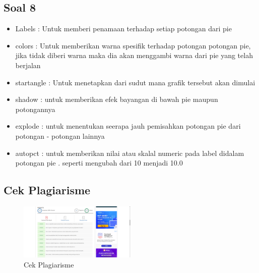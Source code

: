 	\subsection{Soal 8}
	\begin{itemize}
		\item Labels : Untuk memberi penamaan terhadap setiap potongan dari pie
		\item colors : Untuk memberikan warna spesifik terhadap potongan potongan pie, jika tidak diberi warna maka dia akan menggambi warna dari pie yang telah berjalan
		\item startangle : Untuk menetapkan dari sudut mana grafik tersebut akan dimulai
		\item shadow : untuk memberikan efek bayangan di bawah pie maupun potongannya
		\item explode : untuk menentukan seerapa jauh pemisahkan potongan pie dari potongan - potongan lainnya
		\item autopct : untuk memberikan nilai atau skalal numeric pada label didalam potongan pie . seperti mengubah dari 10 menjadi 10.0
	\end{itemize}

	\subsection{Cek Plagiarisme}
	
	\begin{figure}[ht]
            \centerline{\includegraphics[width=0.5\textwidth]{figures/6/1174040/Teori/1174040_plagiat.png}}
            \caption{Cek Plagiarisme}
            \label{1174040_chap6_plagiat}
            \end{figure}